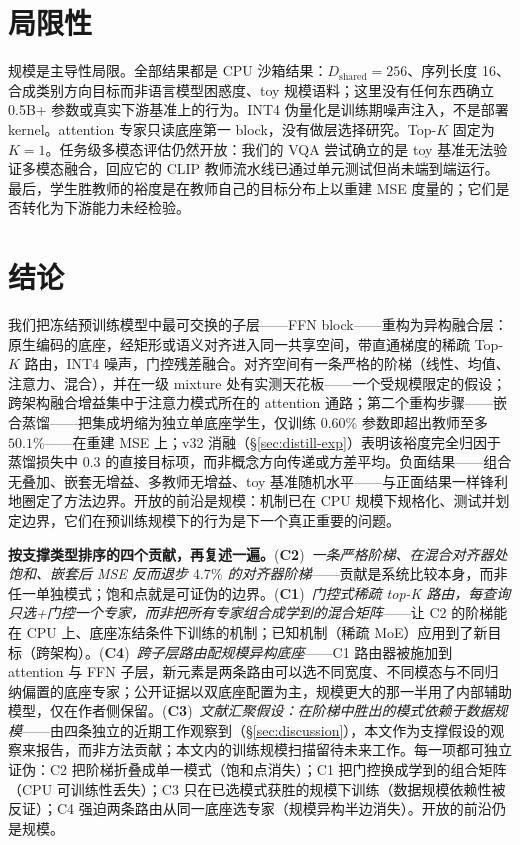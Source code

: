 \documentclass[10pt,twoside]{article}
\begin{document}
\section{局限性}
\label{sec:limitations}

规模是主导性局限。全部结果都是 CPU 沙箱结果：$D_{\text{shared}}{=}256$、序列长度 16、合成类别方向目标而非语言模型困惑度、toy 规模语料；这里没有任何东西确立 0.5B+ 参数或真实下游基准上的行为。INT4 伪量化是训练期噪声注入，不是部署 kernel。attention 专家只读底座第一 block，没有做层选择研究。Top-$K$ 固定为 $K{=}1$。任务级多模态评估仍然开放：我们的 VQA 尝试确立的是 toy 基准无法验证多模态融合，回应它的 CLIP 教师流水线已通过单元测试但尚未端到端运行。最后，学生胜教师的裕度是在教师自己的目标分布上以重建 MSE 度量的；它们是否转化为下游能力未经检验。

\section{结论}
\label{sec:conclusion}

我们把冻结预训练模型中最可交换的子层——FFN block——重构为异构融合层：原生编码的底座，经矩形或语义对齐进入同一共享空间，带直通梯度的稀疏 Top-$K$ 路由，INT4 噪声，门控残差融合。对齐空间有一条严格的阶梯（线性、均值、注意力、混合），并在一级 mixture 处有实测天花板——一个受规模限定的假设；跨架构融合增益集中于注意力模式所在的 attention 通路；第二个重构步骤——嵌合蒸馏——把集成坍缩为独立单底座学生，仅训练 $0.60\%$ 参数即超出教师至多 $50.1\%$——在重建 MSE 上；v32 消融（\S\ref{sec:distill-exp}）表明该裕度完全归因于蒸馏损失中 $0.3$ 的直接目标项，而非概念方向传递或方差平均。负面结果——组合无叠加、嵌套无增益、多教师无增益、toy 基准随机水平——与正面结果一样锋利地圈定了方法边界。开放的前沿是规模：机制已在 CPU 规模下规格化、测试并划定边界，它们在预训练规模下的行为是下一个真正重要的问题。

\textbf{按支撑类型排序的四个贡献，再复述一遍。}(\textbf{C2})~\emph{一条严格阶梯、在混合对齐器处饱和、嵌套后 MSE 反而退步 $4.7\%$ 的对齐器阶梯}——贡献是系统比较本身，而非任一单独模式；饱和点就是可证伪的边界。(\textbf{C1})~\emph{门控式稀疏 top-K 路由，每查询只选+门控一个专家，而非把所有专家组合成学到的混合矩阵}——让 C2 的阶梯能在 CPU 上、底座冻结条件下训练的机制；已知机制（稀疏 MoE）应用到了新目标（跨架构）。(\textbf{C4})~\emph{跨子层路由配规模异构底座}——C1 路由器被施加到 attention 与 FFN 子层，新元素是两条路由可以选不同宽度、不同模态与不同归纳偏置的底座专家；公开证据以双底座配置为主，规模更大的那一半用了内部辅助模型，仅在作者侧保留。(\textbf{C3})~\emph{文献汇聚假设：在阶梯中胜出的模式依赖于数据规模}——由四条独立的近期工作观察到（\S\ref{sec:discussion}），本文作为支撑假设的观察来报告，而非方法贡献；本文内的训练规模扫描留待未来工作。每一项都可独立证伪：C2 把阶梯折叠成单一模式（饱和点消失）；C1 把门控换成学到的组合矩阵（CPU 可训练性丢失）；C3 只在已选模式获胜的规模下训练（数据规模依赖性被反证）；C4 强迫两条路由从同一底座选专家（规模异构半边消失）。开放的前沿仍是规模。
\end{document}
